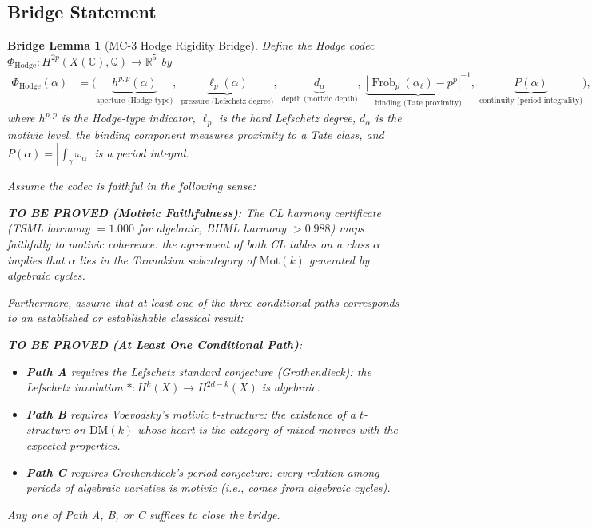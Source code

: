 \documentclass[11pt]{article}
\newtheorem{lemma}{Bridge Lemma}
\theoremstyle{definition}
\DeclareMathOperator{\Frob}{Frob}
\begin{document}
\subsection{Bridge Statement}

\begin{lemma}[MC-3 Hodge Rigidity Bridge]
\label{lem:bridge-MC3}
Define the Hodge codec $\Phi_{\mathrm{Hodge}}: H^{2p}(X(\mathbb{C}), \mathbb{Q}) \to \mathbb{R}^5$ by
\begin{align*}
  \Phi_{\mathrm{Hodge}}(\alpha) &= \bigl(
    \underbrace{h^{p,p}(\alpha)}_{\text{aperture (Hodge type)}},\;
    \underbrace{\ell_p(\alpha)}_{\text{pressure (Lefschetz degree)}},\;
    \underbrace{d_\alpha}_{\text{depth (motivic depth)}},\;
    \underbrace{|\Frob_p(\alpha_\ell) - p^p|^{-1}}_{\text{binding (Tate proximity)}},\;
    \underbrace{P(\alpha)}_{\text{continuity (period integrality)}}
  \bigr),
\end{align*}
where $h^{p,p}$ is the Hodge-type indicator, $\ell_p$ is the hard Lefschetz degree,
$d_\alpha$ is the motivic level, the binding component measures proximity to a
Tate class, and $P(\alpha) = |\int_\gamma \omega_\alpha|$ is a period integral.

Assume the codec is faithful in the following sense:

\medskip
\noindent\textbf{TO BE PROVED (Motivic Faithfulness)}:
\emph{The CL harmony certificate (TSML harmony $= 1.000$ for algebraic,
BHML harmony $> 0.988$) maps faithfully to motivic coherence:
the agreement of both CL tables on a class $\alpha$ implies that
$\alpha$ lies in the Tannakian subcategory of $\mathrm{Mot}(k)$
generated by algebraic cycles.}

\medskip
Furthermore, assume that at least one of the three conditional paths
corresponds to an established or establishable classical result:

\medskip
\noindent\textbf{TO BE PROVED (At Least One Conditional Path)}:
\begin{itemize}
  \item \textbf{Path A} requires the Lefschetz standard conjecture
    (Grothendieck): the Lefschetz involution $* : H^k(X) \to H^{2d-k}(X)$
    is algebraic.
  \item \textbf{Path B} requires Voevodsky's motivic $t$-structure:
    the existence of a $t$-structure on $\mathrm{DM}(k)$ whose heart
    is the category of mixed motives with the expected properties.
  \item \textbf{Path C} requires Grothendieck's period conjecture:
    every relation among periods of algebraic varieties is motivic
    (i.e., comes from algebraic cycles).
\end{itemize}
\emph{Any one of Path A, B, or C suffices to close the bridge.}


\end{lemma}
\end{document}
